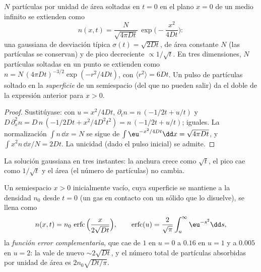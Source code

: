 \begin{proposition}\label{prop:b2:particle-diffusion:gaussian}
$N$ partículas por unidad de área soltadas en $t = 0$ en el plano $x = 0$ de
un medio infinito se extienden como
\[
n(x,t) = \frac{N}{\sqrt{4\pi D t}}\,\exp\Big(-\frac{x^2}{4Dt}\Big) :
\]
una gaussiana de desviación típica $\sigma(t) = \sqrt{2Dt}$, de área constante
$N$ (las partículas se conservan) y de pico decreciente $\propto
1/\sqrt t$. En tres dimensiones, $N$ partículas soltadas en un punto
se extienden como $n = N\,(4\pi Dt)^{-3/2}\exp(-r^2/4Dt)$, con $\langle r^2
\rangle = 6Dt$. Un pulso de partículas soltado en la \emph{superficie} de
un semiespacio (del que no pueden salir) da el doble de la expresión anterior
para $x > 0$.
\end{proposition}

\begin{proof}
Sustitúyase: con $u = x^2/4Dt$, $\partial_t n = n\,(-1/2t + u/t)$ y
$D\,\partial_x^2 n = D\,n\,(-1/2Dt + x^2/4D^2t^2) = n\,(-1/2t + u/t)$;
iguales. La normalización $\int n\,\dd x = N$ se sigue de $\int
\eu^{-x^2/4Dt}\dd x = \sqrt{4\pi Dt}$, y $\int x^2 n\,\dd x/N = 2Dt$.
La unicidad (dado el pulso inicial) se admite.
\end{proof}

\begin{omfigure}

{\small La solución gaussiana en tres instantes: la anchura crece como
$\sqrt t$, el pico cae como $1/\sqrt t$ y el área (el número de
partículas) no cambia.}
\end{omfigure}

\begin{proposition}\label{prop:b2:particle-diffusion:erfc}
Un semiespacio $x > 0$ inicialmente vacío, cuya superficie se mantiene a la
densidad $n_0$ desde $t = 0$ (un gas en contacto con un sólido que
lo disuelve), se llena como
\[
n(x,t) = n_0\,\operatorname{erfc}\Big(\frac{x}{2\sqrt{Dt}}\Big),
\qquad
\operatorname{erfc}(u) = \frac{2}{\sqrt\pi}\int_u^{\infty}\eu^{-s^2}\dd s,
\]
la \emph{función error complementaria}, que cae de $1$ en $u =
0$ a $0.16$ en $u = 1$ y a $0.005$ en $u = 2$: la  vale
de nuevo $\sim 2\sqrt{Dt}$, y el número total de partículas absorbidas por
unidad de área es $2n_0\sqrt{Dt/\pi}$.
\end{proposition}

